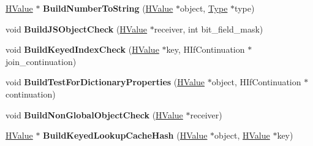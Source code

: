 \begin{DoxyCompactItemize}
\item 
\hypertarget{classv8_1_1internal_1_1_h_graph_builder_a81c75712f4359bb1c9bf57536116639d}{}\hyperlink{classv8_1_1internal_1_1_h_value}{H\+Value} $\ast$ {\bfseries Build\+Number\+To\+String} (\hyperlink{classv8_1_1internal_1_1_h_value}{H\+Value} $\ast$object, \hyperlink{classv8_1_1internal_1_1_type_impl}{Type} $\ast$type)\label{classv8_1_1internal_1_1_h_graph_builder_a81c75712f4359bb1c9bf57536116639d}

\item 
\hypertarget{classv8_1_1internal_1_1_h_graph_builder_a0567331adeff2f3f74acbe6ad06a1280}{}void {\bfseries Build\+J\+S\+Object\+Check} (\hyperlink{classv8_1_1internal_1_1_h_value}{H\+Value} $\ast$receiver, int bit\+\_\+field\+\_\+mask)\label{classv8_1_1internal_1_1_h_graph_builder_a0567331adeff2f3f74acbe6ad06a1280}

\item 
\hypertarget{classv8_1_1internal_1_1_h_graph_builder_a9dc6a61b97712f5bae1d2e2b6c6b75ff}{}void {\bfseries Build\+Keyed\+Index\+Check} (\hyperlink{classv8_1_1internal_1_1_h_value}{H\+Value} $\ast$key, H\+If\+Continuation $\ast$join\+\_\+continuation)\label{classv8_1_1internal_1_1_h_graph_builder_a9dc6a61b97712f5bae1d2e2b6c6b75ff}

\item 
\hypertarget{classv8_1_1internal_1_1_h_graph_builder_ae130cb7f3b8c74d84a46d2161bf643a6}{}void {\bfseries Build\+Test\+For\+Dictionary\+Properties} (\hyperlink{classv8_1_1internal_1_1_h_value}{H\+Value} $\ast$object, H\+If\+Continuation $\ast$continuation)\label{classv8_1_1internal_1_1_h_graph_builder_ae130cb7f3b8c74d84a46d2161bf643a6}

\item 
\hypertarget{classv8_1_1internal_1_1_h_graph_builder_a1c0cd4f82e51b7d9557ceb940501e7fc}{}void {\bfseries Build\+Non\+Global\+Object\+Check} (\hyperlink{classv8_1_1internal_1_1_h_value}{H\+Value} $\ast$receiver)\label{classv8_1_1internal_1_1_h_graph_builder_a1c0cd4f82e51b7d9557ceb940501e7fc}

\item 
\hypertarget{classv8_1_1internal_1_1_h_graph_builder_a61eb8e2b19749149f6f93a9832fa57e7}{}\hyperlink{classv8_1_1internal_1_1_h_value}{H\+Value} $\ast$ {\bfseries Build\+Keyed\+Lookup\+Cache\+Hash} (\hyperlink{classv8_1_1internal_1_1_h_value}{H\+Value} $\ast$object, \hyperlink{classv8_1_1internal_1_1_h_value}{H\+Value} $\ast$key)\label{classv8_1_1internal_1_1_h_graph_builder_a61eb8e2b19749149f6f93a9832fa57e7}


\end{DoxyCompactItemize}
